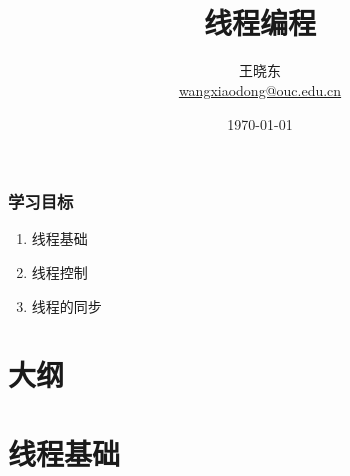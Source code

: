 
\title[KevinW@OUC]{\\  
  线程编程}
\author[王晓东]{王晓东\\
  \href{mailto:wangxiaodong@ouc.edu.cn}{\footnotesize wangxiaodong@ouc.edu.cn}}
\date{\today}


\frame{\titlepage}
\begin{frame}
  \frametitle{学习目标}
  \begin{enumerate}
  \item 线程基础
  \item 线程控制
  \item 线程的同步
  \end{enumerate}  
\end{frame}

\section*{大纲}

\section{线程基础}

